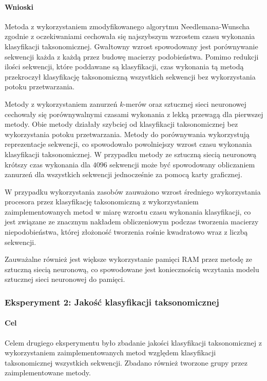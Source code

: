             \paragraph{Wnioski}
                Metoda z wykorzystaniem zmodyfikowanego algorytmu Needlemana-Wunscha zgodnie z oczekiwaniami cechowała się najszybszym wzrostem czasu wykonania klasyfikacji taksonomicznej. Gwałtowny wzrost spowodowany jest porównywanie sekwencji każda z każdą przez budowę macierzy podobieństwa. Pomimo redukcji ilości sekwencji, które poddawane są klasyfikacji, czas wykonania tą metodą przekroczył klasyfikację taksonomiczną wszystkich sekwencji bez wykorzystania potoku przetwarzania.

                Metody z wykorzystaniem zanurzeń $k$-merów oraz sztucznej sieci neuronowej cechowały się porównywalnymi czasami wykonania z lekką przewagą dla pierwszej metody. Obie metody działały szybciej od klasyfikacji taksonomicznej bez wykorzystania potoku przetwarzania. Metody do porównywania wykorzystują reprezentacje sekwencji, co spowodowało powolniejszy wzrost czasu wykonania klasyfikacji taksonomicznej. W przypadku metody ze sztuczną siecią neuronową krótszy czas wykonania dla $4096$ sekwencji może być spowodowany obliczaniem zanurzeń dla wszystkich sekwencji jednocześnie za pomocą karty graficznej.

                W przypadku wykorzystania zasobów zauważono wzrost średniego wykorzystania procesora przez klasyfikację taksonomiczną z wykorzystaniem zaimplementowanych metod w miarę wzrostu czasu wykonania klasyfikacji, co jest związane ze znacznym nakładem obliczeniowym podczas tworzenia macierzy niepodobieństwa, której złożoność tworzenia rośnie kwadratowo wraz z liczbą sekwencji.

                Zauważalne również jest większe wykorzystanie pamięci RAM przez metodę ze sztuczną siecią neuronową, co spowodowane jest koniecznością wczytania modelu sztucznej sieci neuronowej do pamięci.

        \subsubsection{Eksperyment 2: Jakość klasyfikacji taksonomicznej}

            \paragraph{Cel}
                Celem drugiego eksperymentu było zbadanie jakości klasyfikacji taksonomicznej z wykorzystaniem zaimplementowanych metod względem klasyfikacji taksonomicznej wszystkich sekwencji. Zbadano również tworzone grupy przez zaimplementowane metody.

